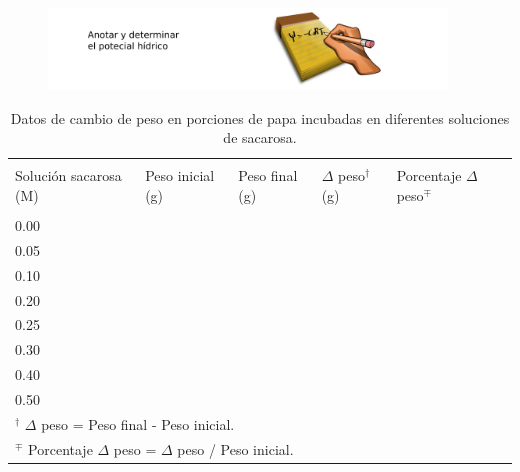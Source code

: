 \documentclass[12pt, aspectratio=169]{beamer}
\begin{document}
	\begin{frame}
	
		\begin{figure}
			\includegraphics[width=400px]{5.png}
			\centering
	\end{figure}
	
	\end{frame}

	\begin{frame}
		\tiny 
		\begin{table}
			 
			\caption{Datos de cambio de peso en porciones de papa incubadas en diferentes soluciones de sacarosa.}
			
			\label{resultados:potencial}
			\centering
			\begin{tabular}{|p{0.17\textwidth}|p{}|p{}|p{}|p{}|}
				
				\hline  &&&& \\
				Soluci\'on sacarosa (M) & Peso inicial (g) & Peso final (g) & $\Delta$ peso$^\dagger$ (g) & Porcentaje $\Delta$ peso$^\mp$ \\
				&&&& \\
				\hline 
				0.00 &&&& \\
				0.05 &&&& \\
				0.10 &&&& \\
				0.20 &&&& \\
				0.25 &&&& \\
				0.30 &&&& \\
				0.40 &&&& \\
				0.50 &&&& \\
				
				\hline 
				
				\multicolumn{5}{l}{\footnotesize $^\dagger$ $\Delta$ peso = Peso final - Peso inicial. } \\
				\multicolumn{5}{l}{\footnotesize $^\mp$ Porcentaje $\Delta$ peso = $\Delta$ peso / Peso inicial. }	
			
			\end{tabular}
		\end{table}
	\end{frame}
\end{document}
